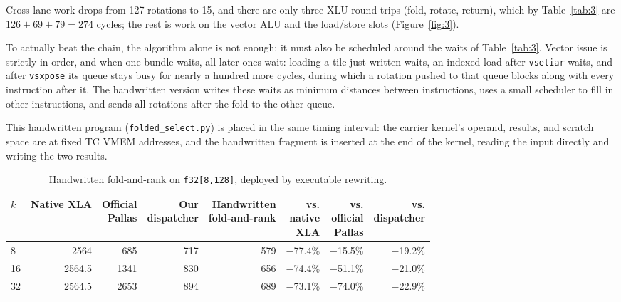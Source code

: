 \documentclass[sigconf,nonacm,balance=false]{acmart}
\newcommand{\code}[1]{\texttt{#1}}
\begin{document}
Cross-lane work drops from 127 rotations to 15, and there are only three XLU round trips (fold, rotate, return), which by Table~\ref{tab:3} are $126 + 69 + 79 = 274$ cycles; the rest is work on the vector ALU and the load/store slots (Figure~\ref{fig:3}).

To actually beat the chain, the algorithm alone is not enough; it must also be scheduled around the waits of Table~\ref{tab:3}. Vector issue is strictly in order, and when one bundle waits, all later ones wait: loading a tile just written waits, an indexed load after \code{vsetiar} waits, and after \code{vsxpose} its queue stays busy for nearly a hundred more cycles, during which a rotation pushed to that queue blocks along with every instruction after it. The handwritten version writes these waits as minimum distances between instructions, uses a small scheduler to fill in other instructions, and sends all rotations after the fold to the other queue.

This handwritten program (\code{folded\_\allowbreak{}select.\allowbreak{}py}) is placed in the same timing interval: the carrier kernel's operand, results, and scratch space are at fixed TC VMEM addresses, and the handwritten fragment is inserted at the end of the kernel, reading the input directly and writing the two results.

\begin{table}
\centering
\caption{Handwritten fold-and-rank on \code{f32[8,\allowbreak{}128]}, deployed by executable rewriting.}
\label{tab:12}
\begin{tabular}{lrrrrrrr}
\toprule
$k$ & Native XLA & \makecell[rb]{Official\\Pallas} & \makecell[rb]{Our\\dispatcher} & \makecell[rb]{Handwritten\\fold-and-rank} & \makecell[rb]{vs.\\native\\XLA} & \makecell[rb]{vs.\\official\\Pallas} & \makecell[rb]{vs.\\dispatcher} \\
\midrule
8 & 2564 & 685 & 717 & 579 & $-$77.4\% & $-$15.5\% & $-$19.2\% \\
16 & 2564.5 & 1341 & 830 & 656 & $-$74.4\% & $-$51.1\% & $-$21.0\% \\
32 & 2564.5 & 2653 & 894 & 689 & $-$73.1\% & $-$74.0\% & $-$22.9\% \\
\bottomrule
\end{tabular}
\end{table}
\end{document}
